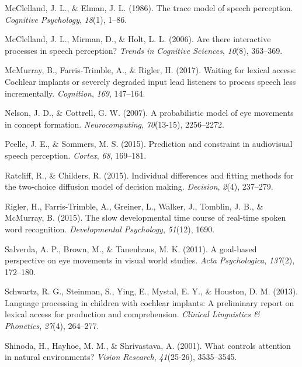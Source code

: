 \documentclass[english,floatsintext,man]{apa6}
\begin{document}
\leavevmode\hypertarget{ref-mcclelland1986trace}{}%
McClelland, J. L., \& Elman, J. L. (1986). The trace model of speech
perception. \emph{Cognitive Psychology}, \emph{18}(1), 1--86.

\leavevmode\hypertarget{ref-mcclelland2006there}{}%
McClelland, J. L., Mirman, D., \& Holt, L. L. (2006). Are there
interactive processes in speech perception? \emph{Trends in Cognitive
Sciences}, \emph{10}(8), 363--369.

\leavevmode\hypertarget{ref-mcmurray2017waiting}{}%
McMurray, B., Farris-Trimble, A., \& Rigler, H. (2017). Waiting for
lexical access: Cochlear implants or severely degraded input lead
listeners to process speech less incrementally. \emph{Cognition},
\emph{169}, 147--164.

\leavevmode\hypertarget{ref-nelson2007probabilistic}{}%
Nelson, J. D., \& Cottrell, G. W. (2007). A probabilistic model of eye
movements in concept formation. \emph{Neurocomputing}, \emph{70}(13-15),
2256--2272.

\leavevmode\hypertarget{ref-peelle2015prediction}{}%
Peelle, J. E., \& Sommers, M. S. (2015). Prediction and constraint in
audiovisual speech perception. \emph{Cortex}, \emph{68}, 169--181.

\leavevmode\hypertarget{ref-ratcliff2015individual}{}%
Ratcliff, R., \& Childers, R. (2015). Individual differences and fitting
methods for the two-choice diffusion model of decision making.
\emph{Decision}, \emph{2}(4), 237--279.

\leavevmode\hypertarget{ref-rigler2015slow}{}%
Rigler, H., Farris-Trimble, A., Greiner, L., Walker, J., Tomblin, J. B.,
\& McMurray, B. (2015). The slow developmental time course of real-time
spoken word recognition. \emph{Developmental Psychology}, \emph{51}(12),
1690.

\leavevmode\hypertarget{ref-salverda2011goal}{}%
Salverda, A. P., Brown, M., \& Tanenhaus, M. K. (2011). A goal-based
perspective on eye movements in visual world studies. \emph{Acta
Psychologica}, \emph{137}(2), 172--180.

\leavevmode\hypertarget{ref-schwartz2013language}{}%
Schwartz, R. G., Steinman, S., Ying, E., Mystal, E. Y., \& Houston, D.
M. (2013). Language processing in children with cochlear implants: A
preliminary report on lexical access for production and comprehension.
\emph{Clinical Linguistics \& Phonetics}, \emph{27}(4), 264--277.

\leavevmode\hypertarget{ref-shinoda2001controls}{}%
Shinoda, H., Hayhoe, M. M., \& Shrivastava, A. (2001). What controls
attention in natural environments? \emph{Vision Research},
\emph{41}(25-26), 3535--3545.
\end{document}
